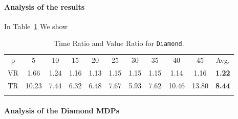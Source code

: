 \paragraph{Analysis of the results}
In Table~\ref{tab:diamond} We show


\begin{table}[h]																	
 \centering
 \small
 \setlength{\tabcolsep}{4.0pt}
 \renewcommand \arraystretch{1.8}
\begin{tabular}{ccccccccccc}																						
p	&	5	&	10	&	15	&	20	&	25	&	30	&	35	&	40	&	45	&	Avg.	\\	
\cmidrule(lr){1-1} \cmidrule(lr){2-10} \cmidrule(lr){11-11}
VR &	1.66	&	1.24	&	1.16	&	1.13	&	1.15	&	1.15	&	1.15	&	1.14	&	1.16	&	\textbf{1.22}	\\	
TR &	10.23	&	7.44	&	6.32	&	6.48	&	7.67	&	5.93	&	7.62	&	10.46	&	13.80	&	\textbf{8.44}	\\	\\
\end{tabular}
\caption{Time Ratio and Value Ratio for \texttt{Diamond}.}														\label{tab:diamond}								
\end{table}																						






\paragraph{Analysis of the Diamond MDPs}

